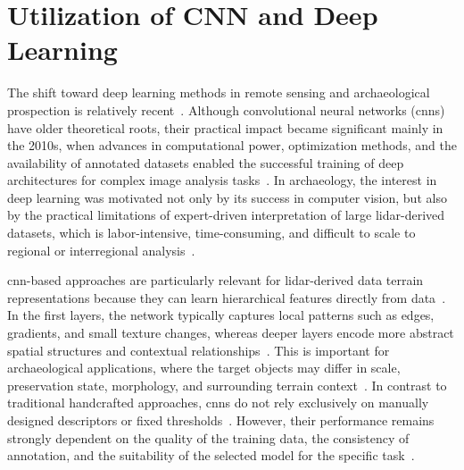 \section{Utilization of CNN and Deep Learning}
The shift toward deep learning methods in remote sensing and archaeological prospection is relatively recent~\cite{fiorucci_deep_2022,bundzel_semantic_2020}. Although convolutional neural networks (\glspl{cnn})~\cite{lecun_convolutional_1998} have older theoretical roots, their practical impact became significant mainly in the 2010s, when advances in computational power, optimization methods, and the availability of annotated datasets enabled the successful training of deep architectures for complex image analysis tasks~\cite{cui_semantic_2020,wurm_semantic_2019}. In archaeology, the interest in deep learning was motivated not only by its success in computer vision, but also by the practical limitations of expert-driven interpretation of large \gls{lidar}-derived datasets, which is labor-intensive, time-consuming, and difficult to scale to regional or interregional analysis~\cite{somrak_learning_2020,verschoof-van_der_vaart_combining_2020}.

\gls{cnn}-based approaches are particularly relevant for \gls{lidar}-derived data terrain representations because they can learn hierarchical features directly from data~\cite{chen_geographic_2018,zhao_semantic_2022}. In the first layers, the network typically captures local patterns such as edges, gradients, and small texture changes, whereas deeper layers encode more abstract spatial structures and contextual relationships~\cite{azarkhordad_detecting_2025,wurm_semantic_2019}. This is important for archaeological applications, where the target objects may differ in scale, preservation state, morphology, and surrounding terrain context~\cite{guyot_objective_2021,wurm_semantic_2019}. In contrast to traditional handcrafted approaches, \glspl{cnn} do not rely exclusively on manually designed descriptors or fixed thresholds~\cite{wurm_semantic_2019,verschoof-van_der_vaart_combining_2020}. However, their performance remains strongly dependent on the quality of the training data, the consistency of annotation, and the suitability of the selected model for the specific task~\cite{bundzel_semantic_2020,griffiths_improving_2019}.

